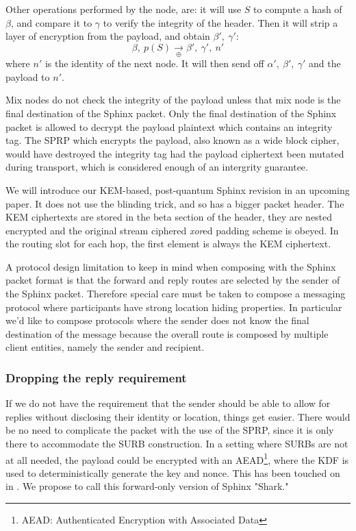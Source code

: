 \documentclass{article}
\begin{document}
Other operations performed by the node, are: it will use $S$ to compute a hash of $\beta$, and compare it to $\gamma$ to verify the integrity of the header. Then it will strip a layer of encryption from the payload, and obtain $\beta',\ \gamma':$ $$\beta,\ p(S)\underset{\oplus}{\longrightarrow} \beta',\ \gamma',\ n'$$ where $n'$ is the identity of the next node. It will then send off $\alpha',\ \beta',\ \gamma'$ and the payload to $n'$.

Mix nodes do not check the integrity of the payload unless that mix node is the final destination of the Sphinx packet. Only the final destination of the Sphinx packet is allowed to decrypt the payload plaintext which contains an integrity tag. The SPRP which encrypts the payload, also known as a wide block cipher, would have destroyed the integrity tag had the payload ciphertext been mutated during transport, which is considered enough of an intergrity guarantee. %

We will introduce our KEM-based, post-quantum Sphinx revision in an upcoming paper. It does not use the blinding trick, and so has a bigger packet header. The KEM ciphertexts are stored in the beta section of the header, they are nested encrypted and the original stream ciphered \textit{xor}ed padding scheme is obeyed. In the routing slot for each hop, the first element is always the KEM ciphertext.

A protocol design limitation to keep in mind when composing with the Sphinx packet format is that the
forward and reply routes are selected by the sender of the Sphinx packet. Therefore special care must be taken to
compose a messaging protocol where participants have strong location hiding properties. In particular we'd like to compose protocols where the sender does not know the final destination of the message because the overall route is composed by multiple client entities, namely the sender and recipient.


\subsubsection{Dropping the reply requirement}

If we do not have the requirement that the sender should be able to allow for replies without disclosing their identity or location, things get easier. There would be no need to complicate the packet with the use of the SPRP, since it is only there to accommodate the SURB construction. In a setting where SURBs are not at all needed, the payload could be encrypted with an AEAD\footnote{AEAD: Authenticated Encryption with Associated Data}, where the KDF is used to deterministically generate the key and nonce. This has been touched on in . We propose to call this forward-only version of Sphinx "Shark."
\end{document}
